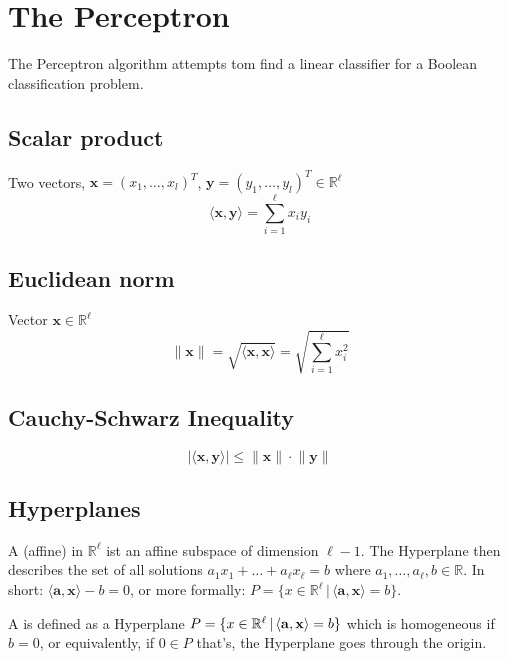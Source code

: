\section{The Perceptron}
The Perceptron algorithm attempts tom find a linear classifier for a Boolean classification problem.
\subsection{Scalar product}
Two vectors, $\mathbf{x} = (x_1,\ldots,x_l)^T$, $\mathbf{y} = (y_1,\ldots,y_l)^T \in \mathbb{R}^\ell$ 
\begin{equation*}
\langle \mathbf{x},\mathbf{y} \rangle = \sum_{i=1}^{\ell} x_iy_i
\end{equation*}
\subsection{Euclidean norm}
Vector $\mathbf{x} \in \mathbb{R}^\ell$ 
\begin{equation*}
\lVert \mathbf{x} \rVert = \sqrt{\langle \mathbf{x},\mathbf{x} \rangle} = \sqrt{ \sum_{i=1}^{\ell} x_i^2}
\end{equation*}
\subsection{Cauchy-Schwarz Inequality}
\begin{equation}
| \langle \mathbf{x},\mathbf{y} \rangle | \leq \lVert \mathbf{x} \rVert \cdot \lVert \mathbf{y} \rVert
\end{equation}

\subsection{Hyperplanes}
A (affine)  in $\mathbb{R}^\ell$ ist an affine subspace of dimension $\ell -1$. The Hyperplane then describes the set of all solutions $a_1x_1 + \ldots + a_\ell x_\ell = b$ where $a_1,\ldots,a_\ell,b \in \mathbb{R}$. In short:  $\langle\mathbf{a}, \mathbf{x}\rangle - b=0$, or more formally: $P = \{x \in \mathbb{R}^\ell\,|\,\langle\mathbf{a}, \mathbf{x}\rangle = b\}$.

A  is defined as a Hyperplane $P = \{x \in \mathbb{R}^\ell\,|\, \langle\mathbf{a}, \mathbf{x}\rangle = b\}$ which is homogeneous if $b = 0$, or equivalently, if $0 \in P$ that's, the Hyperplane goes through the origin.

